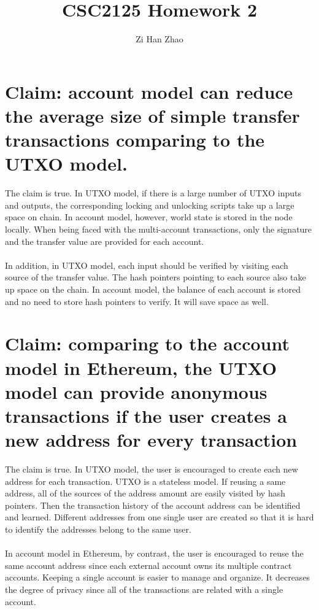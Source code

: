 \documentclass{article}
\author{Zi Han Zhao}
\affil{1001103708}
\title{CSC2125 Homework 2}
\date{}
\begin{document}
\maketitle
\renewcommand{\thesubsection}{(\alph{subsection})}
\section{Claim: account model can reduce the average size of simple transfer transactions
comparing to the UTXO model.}
The claim is true. In UTXO model, if there is a large number of UTXO inputs and outputs, 
the corresponding locking and unlocking scripts take up a large space on chain. 
In account model, however, world state is stored in the node locally. 
When being faced with the multi-account transactions, 
only the signature and the transfer value are provided for each account.\\\\
In addition, in UTXO model, each input should be verified by visiting each source of the transfer value.
The hash pointers pointing to each source also take up space on the chain.
In account model, the balance of each account is stored and no need to store hash pointers to verify.
It will save space as well.
\section{Claim: comparing to the account model in Ethereum, the UTXO model
can provide anonymous transactions if the user creates a new address for every
transaction}
The claim is true.
In UTXO model, the user is encouraged to create each new address for each transaction. 
UTXO is a stateless model. If reusing a same address, 
all of the sources of the address amount are easily visited by hash pointers.
Then the transaction history of the account address can be identified and learned.
Different addresses from one single user are created 
so that it is hard to identify the addresses belong to the same user.\\\\
In account model in Ethereum, by contrast, the user is encouraged to reuse the same account address
since each external account owns its multiple contract accounts. 
Keeping a single account is easier to manage and organize. 
It decreases the degree of privacy since all of the transactions are related with a single account.
\end{document}
